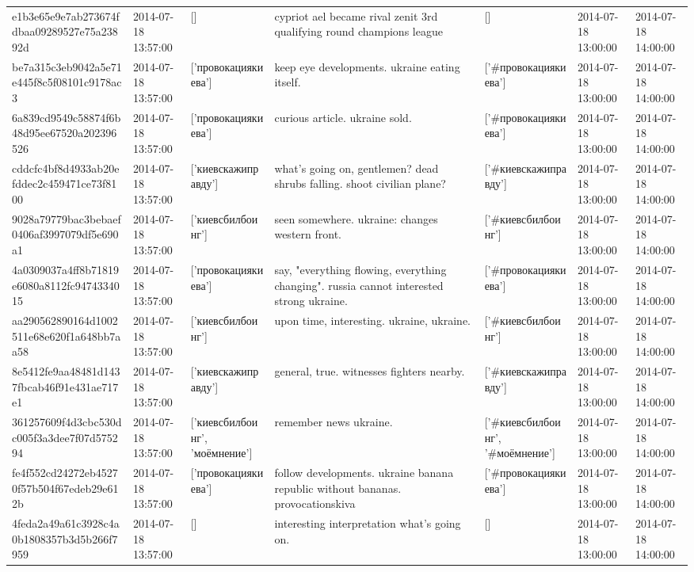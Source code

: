\begin{tabular}{lllllll}
e1b3e65e9e7ab273674fdbaa09289527e75a23892d & 2014-07-18 13:57:00 & [] & cypriot ael became rival zenit 3rd qualifying round champions league & [] & 2014-07-18 13:00:00 & 2014-07-18 14:00:00 \\
be7a315c3eb9042a5e71e445f8c5f08101c9178ac3 & 2014-07-18 13:57:00 & ['провокациякиева'] & keep eye developments. ukraine eating itself. & ['#провокациякиева'] & 2014-07-18 13:00:00 & 2014-07-18 14:00:00 \\
6a839cd9549c58874f6b48d95ee67520a202396526 & 2014-07-18 13:57:00 & ['провокациякиева'] & curious article. ukraine sold. & ['#провокациякиева'] & 2014-07-18 13:00:00 & 2014-07-18 14:00:00 \\
cddcfc4bf8d4933ab20efddec2c459471ce73f8100 & 2014-07-18 13:57:00 & ['киевскажиправду'] & what's going on, gentlemen? dead shrubs falling. shoot civilian plane? & ['#киевскажиправду'] & 2014-07-18 13:00:00 & 2014-07-18 14:00:00 \\
9028a79779bac3bebaef0406af3997079df5e690a1 & 2014-07-18 13:57:00 & ['киевсбилбоинг'] & seen somewhere. ukraine: changes western front. & ['#киевсбилбоинг'] & 2014-07-18 13:00:00 & 2014-07-18 14:00:00 \\
4a0309037a4ff8b71819e6080a8112fc9474334015 & 2014-07-18 13:57:00 & ['провокациякиева'] & say, "everything flowing, everything changing". russia cannot interested strong ukraine. & ['#провокациякиева'] & 2014-07-18 13:00:00 & 2014-07-18 14:00:00 \\
aa290562890164d1002511e68e620f1a648bb7aa58 & 2014-07-18 13:57:00 & ['киевсбилбоинг'] & upon time, interesting. ukraine, ukraine. & ['#киевсбилбоинг'] & 2014-07-18 13:00:00 & 2014-07-18 14:00:00 \\
8e5412fe9aa48481d1437fbcab46f91e431ae717e1 & 2014-07-18 13:57:00 & ['киевскажиправду'] & general, true. witnesses fighters nearby. & ['#киевскажиправду'] & 2014-07-18 13:00:00 & 2014-07-18 14:00:00 \\
361257609f4d3cbc530dc005f3a3dee7f07d575294 & 2014-07-18 13:57:00 & ['киевсбилбоинг', 'моёмнение'] & remember news ukraine. & ['#киевсбилбоинг', '#моёмнение'] & 2014-07-18 13:00:00 & 2014-07-18 14:00:00 \\
fe4f552cd24272eb45270f57b504f67edeb29e612b & 2014-07-18 13:57:00 & ['провокациякиева'] & follow developments. ukraine banana republic without bananas. provocationskiva & ['#провокациякиева'] & 2014-07-18 13:00:00 & 2014-07-18 14:00:00 \\
4feda2a49a61c3928c4a0b1808357b3d5b266f7959 & 2014-07-18 13:57:00 & [] & interesting interpretation what's going on. & [] & 2014-07-18 13:00:00 & 2014-07-18 14:00:00 \\

\end{tabular}

